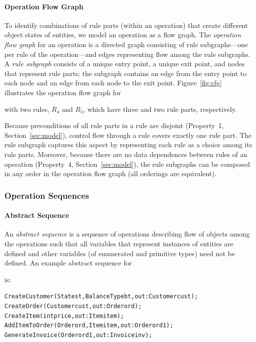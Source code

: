 \vskip -7pt
\paragraph*{Operation Flow Graph} To identify combinations of rule parts (within
an operation) that create different object states of entities, we model an
operation as a flow graph. The \textit{operation flow graph} for an operation is
a directed graph consisting of rule subgraphs---one per rule of the
operation---and edges representing flow among the rule subgraphs. A \textit{rule
  subgraph} consists of a unique entry point, a unique exit point, and nodes
that represent rule parts; the subgraph contains an edge from the entry point to
each node and an edge from each node to the exit point.  Figure~\ref{fig:cfg}
illustrates the operation flow graph for \subject{GenerateInvoice} with two
rules, $R_4$ and $R_5$, which have three and two rule parts, respectively.

Because preconditions of all rule parts in a rule are disjoint (Property~1,
Section~\ref{sec:model}), control flow through a rule covers exactly one rule
part.  The rule subgraph captures this aspect by representing each rule as a
choice among its rule parts. Moreover, because there are no data dependences
between rules of an operation (Property~4, Section~\ref{sec:model}), the rule
subgraphs can be composed in any order in the operation flow graph (\ie all
orderings are equivalent).

\subsubsection{Operation Sequences}

\vskip -10pt
\paragraph*{Abstract Sequence} An \textit{abstract sequence} is a sequence of
operations describing flow of objects among the operations such that all
variables that represent instances of entities are defined and other variables
(of enumerated and primitive types) need not be defined. An example abstract
sequence for \subject{GenerateInvoice} is:

\vspace*{-4pt}
{\scriptsize
\begin{alltt}
 CreateCustomer(State st, BalanceType bt, out: Customer cust);
 CreateOrder(Customer cust, out: Order ord);	
 CreateItem(int price, out: Item item);
 AddItemToOrder(Order ord, Item item, out: Order ord1);
 GenerateInvoice(Order ord1, out: Invoice inv);  
\end{alltt}
}
\vspace*{-5pt}

